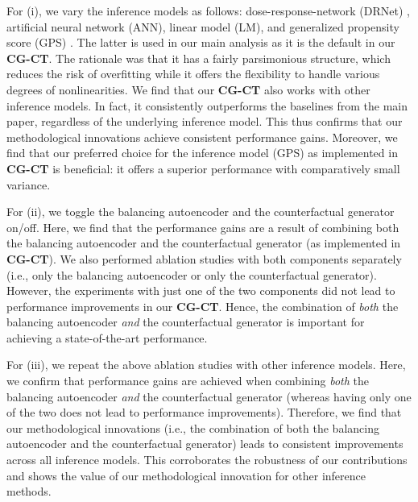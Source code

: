 \documentclass[sigconf]{acmart}
\newcommand{\framework}{\textbf{\mbox{CG-CT}}\xspace}
\begin{document}
For (i), we vary the inference models as follows: dose-response-network (DRNet) \cite{Schwab2020}, artificial neural network (ANN), linear model (LM), and generalized propensity score (GPS) \cite{Hirano2004}. The latter is used in our main analysis as it is the default in our \framework. The rationale was that it has a fairly parsimonious structure, which reduces the risk of overfitting while it offers the flexibility to handle various degrees of nonlinearities. We find that our \framework also works with other inference models. In fact, it consistently outperforms the baselines from the main paper, regardless of the underlying inference model. This thus confirms that our methodological innovations achieve consistent performance gains. Moreover, we find that our preferred choice for the inference model (GPS) as implemented in \framework is beneficial: it offers a superior performance with comparatively small variance. 

For (ii), we toggle the balancing autoencoder and the counterfactual generator on/off. Here, we find that the performance gains are a result of combining both the balancing autoencoder and the counterfactual generator (as implemented in \framework). We also performed ablation studies with both components separately (i.e., only the balancing autoencoder or only the counterfactual generator). However, the experiments with just one of the two components did not lead to performance improvements in our \framework. Hence, the combination of \emph{both} the balancing autoencoder \emph{and} the counterfactual generator is important for achieving a state-of-the-art performance. 

For (iii), we repeat the above ablation studies with other inference models. Here, we confirm that performance gains are achieved when combining \emph{both} the balancing autoencoder \emph{and} the counterfactual generator (whereas having only one of the two does not lead to performance improvements). Therefore, we find that our methodological innovations (i.e., the combination of both the balancing autoencoder and the counterfactual generator) leads to consistent improvements across all inference models. This corroborates the robustness of our contributions and shows the value of our methodological innovation for other inference methods. 
\end{document}
